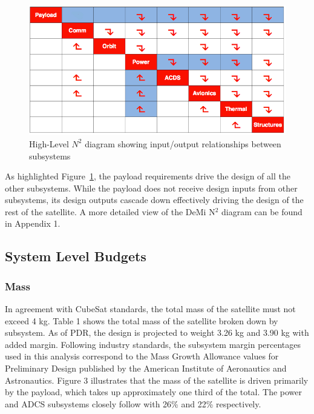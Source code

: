 \documentclass[12pt]{article}
\begin{document}
		\begin{figure}[!ht]
				\centering
				\includegraphics[width=5in]{images/MissionOverview_2.png}
				\caption{High-Level $N^2$ diagram showing input/output relationships between subsystems}
				\label{fig:Mission_N2}
			\end{figure}
			
		As highlighted Figure~\ref{fig:Mission_N2}, the payload requirements drive the design of all the other subsystems. While the payload does not receive design inputs from other subsystems, its design outputs cascade down effectively driving the design of the rest of the satellite. A more detailed view of the DeMi N$^2$ diagram can be found in Appendix 1.
	
	\subsection{System Level Budgets}
		\subsubsection{Mass}
		In agreement with CubeSat standards, the total mass of the satellite must not exceed 4 kg. Table 1 shows the total mass of the satellite broken down by subsystem. As of PDR, the design is projected to weight 3.26 kg and 3.90 kg with added margin. Following industry standards, the subsystem margin percentages used in this analysis correspond to the Mass Growth Allowance values for Preliminary Design published by the American Institute of Aeronautics and Astronautics.\cite{mission_aiaa} Figure 3 illustrates that the mass of the satellite is driven primarily by the payload, which takes up approximately one third of the total. The power and ADCS subsystems closely follow with 26\% and 22\% respectively. 
		
\end{document}
